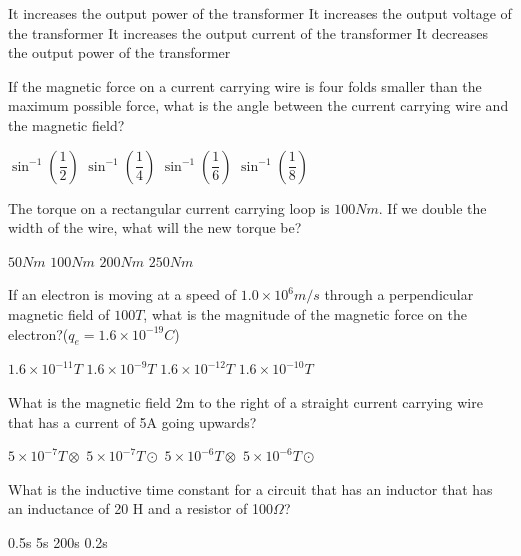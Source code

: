 \documentclass[12pt,addpoints]{exam}
\begin{document}
{{{\begin{questions}
\begin{choices}
						\choice It increases the output power of the transformer
						\choice It increases the output voltage of the transformer
						\choice It increases the output current of the transformer
						\choice It decreases the output power of the transformer
					\end{choices}
					\question If the magnetic force on a current carrying wire is four folds smaller than the maximum possible force, what is the angle between the current carrying wire and the magnetic field? \\
					\begin{oneparchoices}
						\choice $\sin^{-1}(\dfrac{1}{2})$
						\choice $\sin^{-1}(\dfrac{1}{4})$
						\choice $\sin^{-1}(\dfrac{1}{6})$
						\choice $\sin^{-1}(\dfrac{1}{8})$
					\end{oneparchoices}
					\question The torque on a rectangular current carrying loop is $100Nm$. If we double the width of the wire, what will the new torque be? \\ \begin{oneparchoices}
						\choice $50Nm$
						\choice $100Nm$
						\choice $200Nm$
						\choice $250Nm$
					\end{oneparchoices}
					\question If an electron is moving at a speed of $1.0\times10^{6}m/s$ through a perpendicular magnetic field of $100T$, what is the magnitude of the magnetic force on the electron?($q_e=1.6\times10^{-19}C$) \\
					\begin{oneparchoices}
						\choice $1.6\times10^{-11}T$
						\choice $1.6\times10^{-9}T$
						\choice $1.6\times10^{-12}T$
						\choice $1.6\times10^{-10}T$
					\end{oneparchoices}
					\question What is the magnetic field 2m to the right of a straight current carrying wire that has a current of 5A going upwards? \\
					\begin{oneparchoices}
						\choice $5\times10^{-7}T\otimes$
						\choice $5\times10^{-7}T\odot$
						\choice $5\times10^{-6}T\otimes$
						\choice $5\times10^{-6}T\odot$
					\end{oneparchoices}
					\question What is the inductive time constant for a circuit that has an inductor that has an inductance of 20 H and a resistor of 100$\Omega$? \\
					\begin{oneparchoices}
						\choice 0.5s
						\choice 5s
						\choice 200s
						\choice 0.2s
					\end{oneparchoices}

\end{questions}}}}
\end{document}
